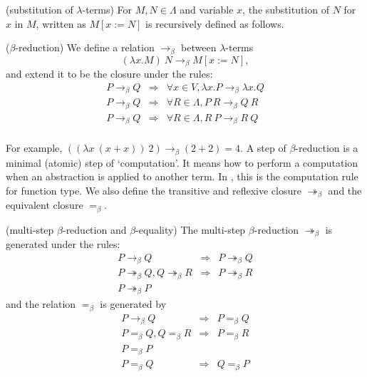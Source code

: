\begin{definition}(substitution of $\lambda$-terms)
    For $M,N\in\Lambda$ and variable $x$, the substitution of $N$ for
    $x$ in $M$, written as $M[x:=N]$ is recursively defined as follows.
\end{definition}


\begin{definition}\label{beta-reduction}($\beta$-reduction)
    We define a relation $\to_\beta$ between $\lambda$-terms
    $$(\lambda x.M)\ N \to_\beta M[x:=N],$$ and extend it to be
    the closure under the rules:
    $$
    \begin{array}{lcl}
        P\to_\beta Q & \Rightarrow & \forall x\in V,\lambda x.P\to_\beta\lambda x.Q \\
        P\to_\beta Q & \Rightarrow & \forall R\in \Lambda,P\ R\to_\beta Q\ R \\
        P\to_\beta Q & \Rightarrow & \forall R\in \Lambda,R\ P\to_\beta R\ Q\\
    \end{array}
    $$
\end{definition}

For example, $((\lambda x\ (x+x))\ 2)\to_\beta(2+2) = 4$. 
A step of $\beta$-reduction is a minimal (atomic) step of
`computation'. It means how to perform a computation when an abstraction
is applied to another term. In \cite{homotopy-type-theory}, this is the 
computation rule for function type. We also define the transitive and 
reflexive closure $\twoheadrightarrow_\beta$ and the equivalent closure 
$=_\beta$.

\begin{definition}
    (multi-step $\beta$-reduction and $\beta$-equality)
    The multi-step $\beta$-reduction $\twoheadrightarrow_\beta$ is
    generated under the rules:
    $$
    \begin{array}{lcl}
        P\to_\beta Q & \Rightarrow & P\twoheadrightarrow_\beta Q \\
        P\twoheadrightarrow_\beta Q, Q\twoheadrightarrow_\beta R & \Rightarrow & P\twoheadrightarrow_\beta R \\
        P\twoheadrightarrow_\beta P &&
    \end{array}
    $$
    and the relation $=_\beta$ is generated by
    $$
    \begin{array}{lcl}
        P\to_\beta Q & \Rightarrow & P=_\beta Q \\
        P=_\beta Q, Q=_\beta R & \Rightarrow & P=_\beta R \\
        P=_\beta P && \\
        P=_\beta Q &\Rightarrow& Q=_\beta P
    \end{array}
    $$
\end{definition}


